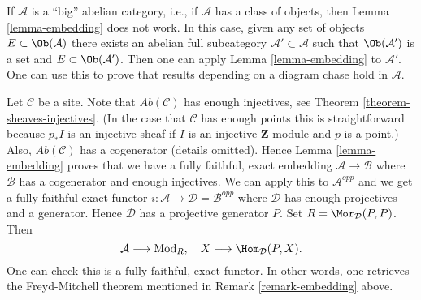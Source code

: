 \begin{remark}
\label{remark-embedding-big}
If $\mathcal{A}$ is a ``big'' abelian category, i.e., if $\mathcal{A}$
has a class of objects, then
Lemma \ref{lemma-embedding}
does not work. In this case, given any set of objects
$E \subset \Ob(\mathcal{A})$ there exists an abelian full subcategory
$\mathcal{A}' \subset \mathcal{A}$ such that
$\Ob(\mathcal{A}')$ is a set and $E \subset \Ob(\mathcal{A}')$.
Then one can apply
Lemma \ref{lemma-embedding}
to $\mathcal{A}'$. One can use this to prove that results depending on
a diagram chase hold in $\mathcal{A}$.
\end{remark}

\begin{remark}
\label{remark-embedding-freyd}
Let $\mathcal{C}$ be a site.
Note that $\textit{Ab}(\mathcal{C})$ has enough injectives, see
Theorem \ref{theorem-sheaves-injectives}.
(In the case that $\mathcal{C}$ has enough points this is straightforward
because  $p_*I$ is an injective sheaf if $I$ is an injective
$\mathbf{Z}$-module and $p$ is a point.)
Also, $\textit{Ab}(\mathcal{C})$ has a cogenerator (details omitted).
Hence
Lemma \ref{lemma-embedding}
proves that we have a fully faithful, exact embedding
$\mathcal{A} \to \mathcal{B}$ where $\mathcal{B}$ has a
cogenerator and enough injectives.
We can apply this to $\mathcal{A}^{opp}$ and we get a
fully faithful exact functor
$i : \mathcal{A} \to \mathcal{D} = \mathcal{B}^{opp}$
where $\mathcal{D}$ has enough projectives and a generator. Hence
$\mathcal{D}$ has a projective generator $P$.
Set $R = \Mor_\mathcal{D}(P, P)$. Then
$$
\mathcal{A} \longrightarrow \text{Mod}_R, \quad
X \longmapsto \Hom_\mathcal{D}(P, X).
$$
One can check this is a fully faithful, exact functor.
In other words, one retrieves the
Freyd-Mitchell theorem mentioned in
Remark \ref{remark-embedding}
above.
\end{remark}

